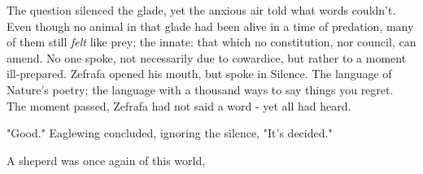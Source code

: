 




The question silenced the glade, yet the anxious air told what words couldn't. Even though no animal in that glade had been alive in a time of predation, many of them still \textit{felt} like prey; the innate: that which no constitution, nor council, can amend.
No one spoke, not necessarily due to cowardice, but rather to a moment ill-prepared.
  Zefrafa opened his mouth, but spoke in Silence. The language of Nature's poetry; the language with a thousand ways to say things you regret.
The moment passed, Zefrafa had not said a word - yet all had heard. 

"Good." Eaglewing concluded, ignoring the silence, "It's decided."  %


A sheperd was once again of this world, 


